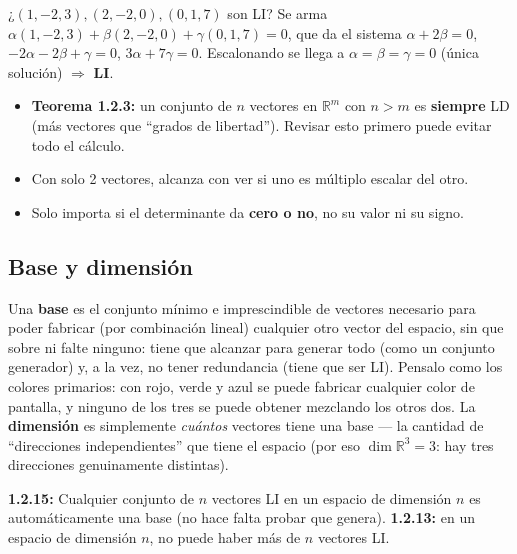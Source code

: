\documentclass[11pt,a4paper]{article}
\begin{document}
\begin{ejemplo}
¿$(1,-2,3),(2,-2,0),(0,1,7)$ son LI? Se arma $\alpha(1,-2,3)+\beta(2,-2,0)+\gamma(0,1,7)=0$,
que da el sistema $\alpha+2\beta=0$, $-2\alpha-2\beta+\gamma=0$, $3\alpha+7\gamma=0$.
Escalonando se llega a $\alpha=\beta=\gamma=0$ (única solución) $\Rightarrow$ \textbf{LI}.
\end{ejemplo}

\begin{atencion}
\begin{itemize}
    \item \textbf{Teorema 1.2.3:} un conjunto de $n$ vectores en $\mathbb R^m$ con $n>m$
    es \textbf{siempre} LD (más vectores que ``grados de libertad''). Revisar esto primero
    puede evitar todo el cálculo.
    \item Con solo 2 vectores, alcanza con ver si uno es múltiplo escalar del otro.
    \item Solo importa si el determinante da \textbf{cero o no}, no su valor ni su signo.
\end{itemize}
\end{atencion}

\subsection{Base y dimensión}

\begin{intuicion}
Una \textbf{base} es el conjunto mínimo e imprescindible de vectores necesario para poder
fabricar (por combinación lineal) cualquier otro vector del espacio, sin que sobre ni
falte ninguno: tiene que alcanzar para generar todo (como un conjunto generador) y, a la
vez, no tener redundancia (tiene que ser LI). Pensalo como los colores primarios: con
rojo, verde y azul se puede fabricar cualquier color de pantalla, y ninguno de los tres se
puede obtener mezclando los otros dos. La \textbf{dimensión} es simplemente
\emph{cuántos} vectores tiene una base — la cantidad de ``direcciones independientes''
que tiene el espacio (por eso $\dim\mathbb R^3=3$: hay tres direcciones genuinamente
distintas).
\end{intuicion}

\begin{teoria}
\textbf{1.2.15:} Cualquier conjunto de $n$ vectores LI en un espacio de dimensión $n$ es
automáticamente una base (no hace falta probar que genera). \textbf{1.2.13:} en un espacio
de dimensión $n$, no puede haber más de $n$ vectores LI.
\end{teoria}
\end{document}
